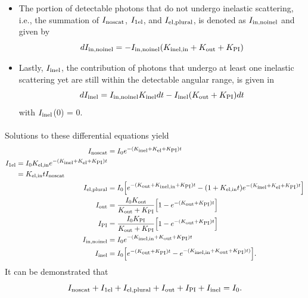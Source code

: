 \documentclass[review]{elsarticle}
\newcommand\nt{\textup{\scriptsize{0}}}
\newcommand\el{\textup{\scriptsize{el}}}
\newcommand\inel{\textup{\scriptsize{inel}}}
\newcommand\elin{\textup{\scriptsize{el,in}}}
\newcommand\inelin{\textup{\scriptsize{inel,in}}}
\newcommand\out{\textup{\scriptsize{out}}}
\newcommand\PI{\textup{\scriptsize{PI}}}
\newcommand\noscat{\textup{\scriptsize{noscat}}}
\newcommand\sel{\textup{\scriptsize{1el}}}
\newcommand\elpl{\textup{\scriptsize{el,plural}}}
\newcommand\innoinel{\textup{\scriptsize{in,noinel}}}
\begin{document}
\begin{itemize}
\item The portion of detectable photons that do not undergo inelastic scattering, i.e., the summation of $I_{\noscat}$, $I_{\sel}$, and $I_{\elpl}$, is denoted as $I_{\innoinel}$ and given by
\begin{equation}
dI_{\innoinel} = -I_{\innoinel}(K_{\inelin}+K_{\out}+K_{\PI})
\end{equation}

\item Lastly, $I_{\inel}$, the contribution of photons that undergo at least one inelastic scattering yet are still within the detectable angular range, is given in
\begin{equation}
dI_{\inel} = I_{\innoinel}K_{\inel} dt - I_{\inel}(K_{\out}+K_{\PI}) dt
\end{equation}
with $I_{\inel}$(0) = 0.

\end{itemize}


\paragraph{} Solutions to these differential equations yield
\begin{align}
I_{\noscat} &= I_{\nt}e^{-(K_{\inel}+K_{\el}+K_{\PI})t}
\label{x1} \\
\begin{split}
\label{x2}
I_{\sel} &= I_{\nt}K_{\elin}e^{-(K_{\inel}+K_{\el}+K_{\PI})t} \\
	&= K_{\elin}tI_{\noscat}
\end{split} \\
I_{\elpl} &= I_{\nt} \Big[ e^{-(K_{\out}+K_{\inelin}+K_{\PI})t} - (1+K_{\elin}t)e^{-(K_{\inel}+K_{\el}+K_{\PI})t} \Big]
\label{x3} \\
I_{\out} &= \frac{I_{\nt}K_{\out}}{K_{\out}+K_{\PI}} \Big[1 - e^{-(K_{\out}+K_{\PI})t}\Big]
\label{x4} \\
I_{\PI} &= \frac{I_{\nt}K_{\PI}}{K_{\out}+K_{\PI}} \Big[1 - e^{-(K_{\out}+K_{\PI})t}\Big]
\label{x5} \\
I_{\innoinel} &= I_{\nt}e^{-(K_{\inelin}+K_{\out}+K_{\PI})t}
\label{x6} \\
I_{\inel} &= I_{\nt}\Big[e^{-(K_{\out}+K_{\PI})t} - e^{-(K_{\inelin}+K_{\out}+K_{\PI})t)}\Big].
\label{x7}
\end{align}
It can be demonstrated that
\begin{equation}
I_{\noscat} + I_{\sel} + I_{\elpl} + I_{\out} + I_{\PI} + I_{\inel} = I_{\nt}.
\end{equation}
\end{document}

